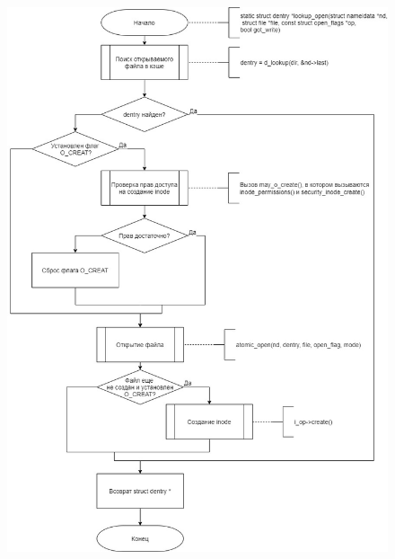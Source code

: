 \documentclass[a4paper,14pt]{extreport}
\begin{document}
\begin{figure}[H]
	\centering
	\includegraphics[scale=0.45]{img/lookup_open.jpg}
\end{figure}





















	
\end{document}
